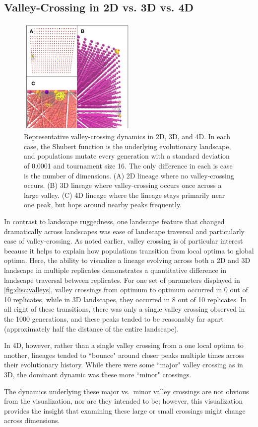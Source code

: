 \subsection{Valley-Crossing in 2D vs. 3D vs. 4D}

\begin{figure}
    \centering
    \includegraphics[width=0.5\textwidth]{chapters/3-vr-viz/figs/valley.png}
    \caption{Representative valley-crossing dynamics in 2D, 3D, and 4D. In each case, the Shubert function is the underlying evolutionary landscape, and populations mutate every generation with a standard deviation of 0.0001 and tournament size 16. The only difference in each is case is the number of dimensions. (A) 2D lineage where no valley-crossing occurs. (B) 3D lineage where valley-crossing occurs once across a large valley. (C) 4D lineage where the lineage stays primarily near one peak, but hops around nearby peaks frequently. }
    \label{fig:disc:valleys}
\end{figure}

In contrast to landscape ruggedness, one landscape feature that changed dramatically across landscapes was ease of landscape traversal and particularly ease of valley-crossing. As noted earlier, valley crossing is of particular interest because it helps to explain how populations transition from local optima to global optima. Here, the ability to visualize a lineage evolving across both a 2D and 3D landscape in multiple replicates demonstrates a quantitative difference in landscape traversal between replicates. For one set of parameters displayed in \autoref{fig:disc:valleys}, valley crossings from optimum to optimum occurred in 0 out of 10 replicates, while in 3D landscapes, they occurred in 8 out of 10 replicates. In all eight of these transitions, there was only a single valley crossing observed in the 1000 generations, and these peaks tended to be reasonably far apart (approximately half the distance of the entire landscape).

In 4D, however, rather than a single valley crossing from a one local optima to another, lineages tended to ``bounce" around closer peaks  multiple times across their evolutionary history. While there were some ``major" valley crossing as in 3D, the dominant dynamic was these more ``minor" crossings. 

The dynamics underlying these major vs.~minor valley crossings are not obvious from the visualization, nor are they intended to be; however, this visualization provides the insight that examining these large or small crossings might change across dimensions. 